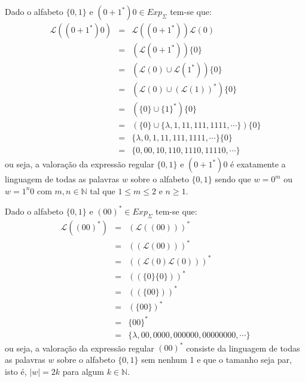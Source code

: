 \begin{example}\label{exe:ValoracaoExpressao2}
	Dado o alfabeto $\{0,1\}$ e $(0 + 1^*)0 \in Exp_\Sigma$ tem-se que:
	\begin{eqnarray*}
		\mathcal{L}((0 + 1^*)0 ) & = & \mathcal{L}((0 + 1^*))\mathcal{L}(0)\\
		& = & (\mathcal{L}(0 + 1^*))\{0\}\\
		& = & (\mathcal{L}(0) \cup  \mathcal{L}(1^*))\{0\}\\
		& = & (\mathcal{L}(0) \cup  (\mathcal{L}(1))^*)\{0\}\\
		& = & (\{0\} \cup \{1\}^*)\{0\}\\
		& = & (\{0\} \cup \{\lambda, 1, 11, 111, 1111, \cdots\})\{0\}\\
		& = & \{\lambda, 0, 1, 11, 111, 1111, \cdots\}\{0\}\\
		& = & \{0, 00, 10, 110, 1110, 11110, \cdots \}
	\end{eqnarray*}
	ou seja, a valoração da expressão regular $\{0,1\}$ e $(0 + 1^*)0$ é exatamente a linguagem de todas as palavras $w$ sobre o alfabeto $\{0,1\}$  sendo que $w = 0^m$ ou $w = 1^n0$ com $m,n \in \mathbb{N}$ tal que $1 \leq m \leq 2$ e $n \geq 1$.
\end{example}

\begin{example}\label{exe:ValoracaoExpressao1}
	Dado o alfabeto $\{0,1\}$ e $(00)^* \in Exp_\Sigma$ tem-se que:
	\begin{eqnarray*}
		\mathcal{L}((00)^*) & = & (\mathcal{L}((00)))^*\\
		& = & ((\mathcal{L}(00)))^*\\
		& = & ((\mathcal{L}(0)\mathcal{L}(0)))^*\\
		& = & ((\{0\}\{0\}))^*\\
		& = & ((\{00\}))^*\\
		& = & (\{00\})^*\\
		& = & \{00\}^*\\
		& = & \{\lambda, 00, 0000, 000000, 00000000, \cdots\}
	\end{eqnarray*}
	ou seja, a valoração da expressão regular $(00)^*$ consiste da linguagem de todas as palavras $w$ sobre o alfabeto $\{0,1\}$ sem nenhum 1 e que o tamanho seja par, isto é, $|w| = 2k$ para algum $k \in \mathbb{N}$.
\end{example}

